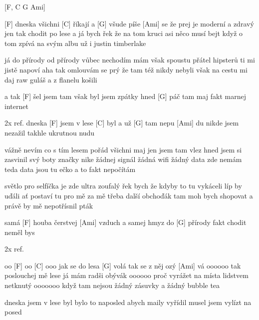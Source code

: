 
[F, C G Ami]

[F] dneska všichni [C] říkají a [G] všude píše [Ami] se
že prej je moderní a zdravý jen tak chodit po lese
a já bych řek že na tom kruci asi něco musí bejt
když o tom zpívá na svým albu už i justin timberlake

já do přírody od přírody vůbec nechodím
mám však spoustu přátel hipsterů ti mi jistě napoví
aha tak omlouvám se prý že tam též nikdy nebyli
však na cestu mi daj raw guláš a z flanelu košili

a tak [F] šel jsem tam však byl jsem zpátky hned
[G] páč tam maj fakt marnej internet

2x ref. dneska [F] jsem v lese [C] byl
a už [G] tam nepu [Ami] du
nikde jsem nezažil takhle ukrutnou nudu

vážně nevím co s tím lesem pořád všichni maj
jen jsem tam vlez hned jsem si zasvinil svý boty značky nike
žádnej signál žádná wifi žádný data zde nemám
teda data jsou tu ečko a to fakt nepočítám

světlo pro selfíčka je zde ultra zoufalý
řek bych že kdyby to tu vykáceli líp by uďáli
ať postaví tu pro mě za mě třeba další obchoďák
tam moh bych shopovat a právě by mě nepotřísnil pták

samá [F] houba čerstvej [Ami] vzduch a samej hmyz
do [G] přírody fakt chodit neměl bys

2x ref.

oo [F] oo [C] ooo jak se do lesa [G] volá tak se z něj ozý [Ami] vá
oooooo tak poslouchej mě lese já mám radši obývák
oooooo proč vyrážet na místa lidstvem netknutý
ooooooo když tam nejsou žádný zásuvky a žádný bubble tea

dneska jsem v lese byl
bylo to naposled
abych maily vyřídil
musel jsem vylízt na posed



